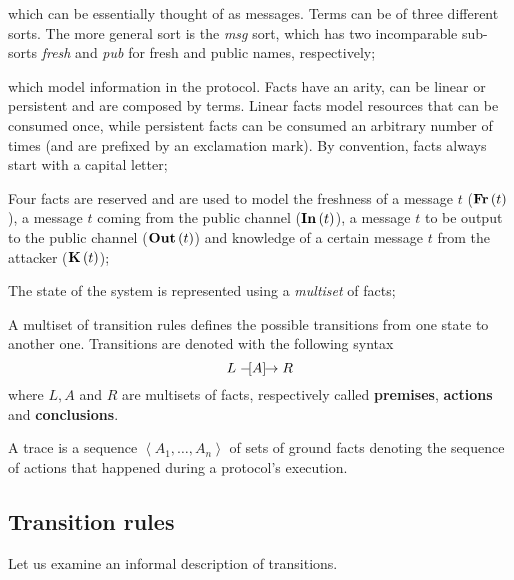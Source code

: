 \begin{description}[style=nextline]
    \item[Terms] which can be essentially thought of as messages. Terms can be of three different sorts. The more general sort is the \textit{msg} sort, which has two incomparable sub-sorts \textit{fresh} and \textit{pub} for fresh and public names, respectively;
    \item[Facts] which model information in the protocol. Facts have an arity, can be linear or persistent and are composed by terms. Linear facts model resources that can be consumed once, while persistent facts can be consumed an arbitrary number of times (and are prefixed by an exclamation mark). By convention, facts always start with a capital letter;
    \item[Special facts] Four facts are reserved and are used to model the freshness of a message $t$ ($\mbox{\textbf{Fr}}\left(t\right)$), a message $t$ coming from the public channel ($\mbox{\textbf{In}}\left(t\right)$), a message $t$ to be output to the public channel ($\mbox{\textbf{Out}}\left(t\right)$) and knowledge of a certain message $t$ from the attacker ($\mbox{\textbf{K}}\left(t\right)$);
    \item[State of the system] The state of the system is represented using a \textit{multiset} of facts;
    \item[Transition rules] A multiset of transition rules defines the possible transitions from one state to another one. Transitions are denoted with the following syntax
        \begin{equation}
            L \mathrel{-\hspace{-2pt}[A]\hspace{-4pt}\to} R
        \end{equation}
        where $L, A$ and $R$ are multisets of facts, respectively called \textbf{premises}, \textbf{actions} and \textbf{conclusions}.
    \item[Trace] A trace is a sequence $\left<A_1, \ldots, A_n\right>$ of sets of ground facts denoting the sequence of actions that happened during a protocol's execution.
\end{description}


\subsection{Transition rules}
\label{sub:Transition-rules}
Let us examine an informal description of transitions.

